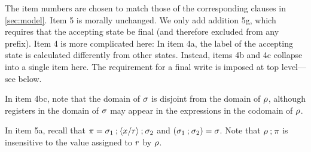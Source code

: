 The item numbers are chosen to match those of the corresponding clauses in
\textsection\ref{sec:model}.  Item 5 is morally unchanged.  We only add
addition 5g, which requires that the accepting state be final (and therefore
excluded from any prefix).
Item 4 is more complicated here:
In item 4a, the label of the accepting state is calculated differently from
other states. Instead, items 4b and 4c collapse into a single item here.
The requirement for a final write is imposed at top level---see below.

In item 4bc, note that the domain of $\aSubC$ is disjoint from the domain
of $\SUBDRS{\aPS^1}$, although registers in the domain of $\aSubC$ may
appear in the expressions in the codomain of $\SUBDRS{\aPS^1}$.

In item 5a, recall that $\bSub=\beforeSub\SUBSEQ\SUB{\aLoc/\aReg}\SUBSEQ\afterSub$ and
$(\beforeSub\SUBSEQ\afterSub) = \aSub$.
Note that
$\SUBDRS{\aPS^1}\SUBSEQ \bSub$ is insensitive to the value assigned to $\aReg$ by
$\SUBDRS{\aPS^1}$.

